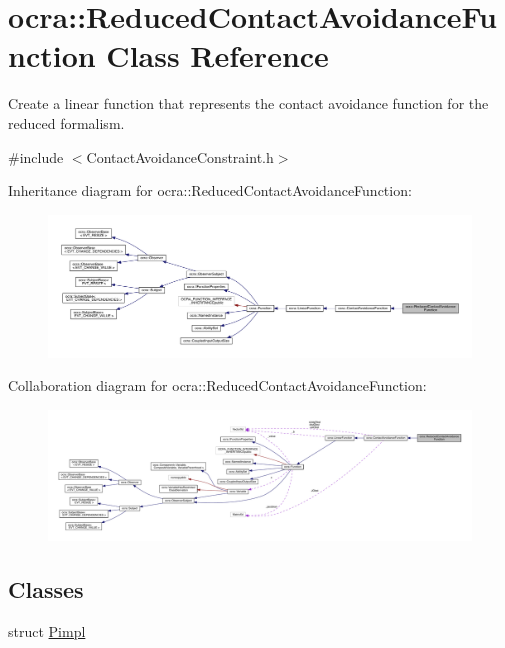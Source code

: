 \hypertarget{classocra_1_1ReducedContactAvoidanceFunction}{}\section{ocra\+:\+:Reduced\+Contact\+Avoidance\+Function Class Reference}
\label{classocra_1_1ReducedContactAvoidanceFunction}


Create a linear function that represents the contact avoidance function for the reduced formalism.  




{\ttfamily \#include $<$Contact\+Avoidance\+Constraint.\+h$>$}



Inheritance diagram for ocra\+:\+:Reduced\+Contact\+Avoidance\+Function\+:\nopagebreak
\begin{figure}[H]
\begin{center}
\leavevmode
\includegraphics[width=350pt]{d8/dda/classocra_1_1ReducedContactAvoidanceFunction__inherit__graph}
\end{center}
\end{figure}


Collaboration diagram for ocra\+:\+:Reduced\+Contact\+Avoidance\+Function\+:\nopagebreak
\begin{figure}[H]
\begin{center}
\leavevmode
\includegraphics[width=350pt]{d3/d0b/classocra_1_1ReducedContactAvoidanceFunction__coll__graph}
\end{center}
\end{figure}
\subsection*{Classes}
\begin{DoxyCompactItemize}
\item 
struct \hyperlink{structReducedContactAvoidanceFunction_1_1Pimpl}{Pimpl}
\end{DoxyCompactItemize}
